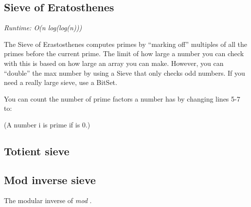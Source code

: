 
\subsection*{Sieve of Eratosthenes}

\textit{Runtime: O(n log(log(n)))}

The Sieve of Erastosthenes computes primes by “marking off” multiples of all the primes before the current prime. The limit of how large a number you can check with this is based on how large an array you can make. However, you can “double” the max number by using a Sieve that only checks odd numbers. If you need a really large sieve, use a BitSet.



You can count the number of prime factors a number has by changing lines 5-7 to:



(A number i is prime if  is 0.)

\subsection*{Totient sieve}



\subsection*{Mod inverse sieve}

The modular inverse of  \textit{mod} .



\newpage